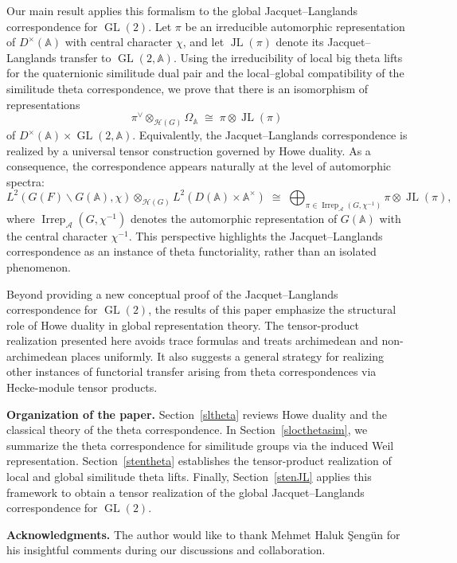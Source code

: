 \documentclass[11pt]{article}
\theoremstyle{plain}
\theoremstyle{remark}
\theoremstyle{definition}
\DeclareMathOperator{\GL}{GL}
\DeclareMathOperator{\JL}{JL}
\DeclareMathOperator{\irr}{Irrep}
\begin{document}
Our main result applies this formalism to the global Jacquet--Langlands correspondence for $\GL(2)$.
Let $\pi$ be an irreducible automorphic representation of $D^{\times}(\mathbb{A})$ with central character $\chi$, and let $\JL(\pi)$ denote its Jacquet--Langlands transfer to $\GL(2,\mathbb{A})$.
Using the irreducibility of local big theta lifts for the quaternionic similitude dual pair and the local--global compatibility of the similitude theta correspondence, we prove that there is an isomorphism of representations
\[
\pi^{\vee} \otimes_{\mathcal{H}(G)} \Omega_{\mathbb{A}}
\;\cong\;
\pi \otimes \JL(\pi)
\]
of $D^{\times}(\mathbb{A}) \times \GL(2,\mathbb{A})$.
Equivalently, the Jacquet--Langlands correspondence is realized by a universal tensor construction governed by Howe duality. 
As a consequence, the correspondence appears naturally at the level of automorphic spectra:
\[
L^2(G(F)\backslash G(\mathbb{A}),\chi) \otimes_{\mathcal{H}(G)} L^2(D(\mathbb{A})\times \mathbb{A}^{\times})
\;\cong\;
\bigoplus_{\pi \in \irr_{\mathcal{A}}(G,\chi^{-1})} \pi \otimes \JL(\pi),
\]
where $\irr_{\mathcal{A}}(G,\chi^{-1})$ denotes the automorphic representation of $G(\mathbb{A})$ with the central character $\chi^{-1}$. 
This perspective highlights the Jacquet--Langlands correspondence as an instance of theta functoriality, rather than an isolated phenomenon.

Beyond providing a new conceptual proof of the Jacquet--Langlands correspondence for $\GL(2)$, the results of this paper emphasize the structural role of Howe duality in global representation theory.
The tensor-product realization presented here avoids trace formulas and treats archimedean and non-archimedean places uniformly.
It also suggests a general strategy for realizing other instances of functorial transfer arising from theta correspondences via Hecke-module tensor products.

\medskip
\noindent
\textbf{Organization of the paper.}
Section~\ref{sltheta} reviews Howe duality and the classical theory of the theta correspondence.
In Section~\ref{slocthetasim}, we summarize the theta correspondence for similitude groups via the induced Weil representation.
Section~\ref{stentheta} establishes the tensor-product realization of local and global similitude theta lifts.
Finally, Section~\ref{stenJL} applies this framework to obtain a tensor realization of the global Jacquet--Langlands correspondence for $\GL(2)$.

\medskip
\noindent
\textbf{Acknowledgments.} The author would like to thank Mehmet Haluk \c{S}eng\"un for his insightful comments during our discussions and collaboration. 
\end{document}
